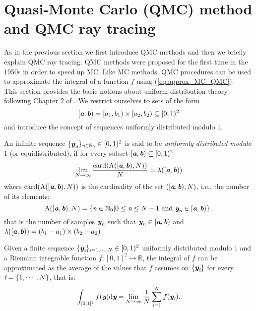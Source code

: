 \section{Quasi-Monte Carlo (QMC) method and QMC ray tracing}\label{sec:QMC}
As in the previous section we first introduce QMC methods and then we briefly explain QMC ray tracing. QMC methods were proposed for the first time in the 1950s in order to speed up MC. Like MC methods, QMC procedures can be used to approximate the integral of a function $f$ using (\ref{eq:approx_MC_QMC}).\\ \indent
This section provides the basic notions about uniform distribution theory following Chapter $2$ of \cite{leobacher2014introduction}. 
We restrict ourselves to sets of the form $$[\textit{\textbf{a}}, \textit{\textbf{b}})= [a_1,b_1)\times[a_2, b_2)\subseteq[0,1)^2$$ and introduce the concept of sequences uniformly distributed modulo $1$.
\begin{definition}
An infinite sequence $\{\textit{\textbf{y}}_{\textit{n}}\}_{\textit{n}\in\mathbb{N}_0} \in [0,1)^2$ is said to be \textit{uniformly distributed modulo $1$} (or equidistributed), if for every subset $[\textit{\textbf{a}},\textit{\textbf{b}})\subseteq[0,1)^2$
\begin{equation}
\lim_{N\rightarrow \infty}\frac{\textrm{card}(\mbox{$\textup{A}$}([\textit{\textbf{a}},\textit{\textbf{b}}), N))}{N} = \lambda([\textit{\textbf{a}},\textit{\textbf{b}}))
\end{equation}
where $\textrm{card}(\insieme{A}([\vect{a},\vect{b}), N))$ is the cardinality of the set $([\textit{\textbf{a}},\textit{\textbf{b}}), N)$, i.e., the number of its elements:
\begin{equation}
\mbox{$\textup{A}$}([\textit{\textbf{a}},\textit{\textbf{b}}), N) = \{\textit{n}\in \mathbb{N}_0 | 0\leq\textit{n}\leq N-1 \mbox{ and } \textit{\textbf{y}}_{\textit{n}}\in [\textit{\textbf{a}},\textit{\textbf{b}})\}\,,
\end{equation} 
that is the number of samples $\textit{\textbf{y}}_{\textit{n}}$ such that $\textit{\textbf{y}}_{\textit{n}}\in [\textit{\textbf{a}},\textit{\textbf{b}})$ and $\lambda([\textit{\textbf{a}},\textit{\textbf{b}})) =(b_1-a_1)\times (b_2-a_2)$.
\end{definition}
Given a finite sequence $\{\textit{\textbf{y}}_{\textit{i}}\}_{\textit{i} = 1, \cdots, N}\in[0,1)^2$ uniformly distributed modulo $1$ and a 
Riemann integrable function $f:[0,1]^2\rightarrow \mathbb{R}$, the integral of $f$ can be approximated as the average of the values that $f$ assumes on $\{\textit{\textbf{y}}_{\textit{i}}\}$ for every $\textit{i}=\{1, \cdots, N\}$, that is:
\begin{equation}
 \int_{[0,1]^2}f(\textit{\textbf{y}})\textrm{d}\textit{\textbf{y}} = \lim_{N\rightarrow \infty}\frac{1}{N}\sum_{\textit{i}=1}^{N}f(\textit{\textbf{y}}_{\textit{i}}).
\end{equation}
